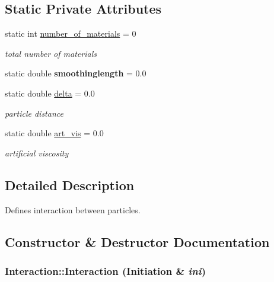 \subsection*{Static Private Attributes}
\begin{CompactItemize}
\item 
\hypertarget{classInteraction_aeeeca2f8dcc8cd22803b2ef6633319f}{
static int \hyperlink{classInteraction_aeeeca2f8dcc8cd22803b2ef6633319f}{number\_\-of\_\-materials} = 0}
\label{classInteraction_aeeeca2f8dcc8cd22803b2ef6633319f}

\begin{CompactList}\small\item\em total number of materials \item\end{CompactList}\item 
\hypertarget{classInteraction_7d9addfe3a9f9c69357d900cd9495c94}{
static double \textbf{smoothinglength} = 0.0}
\label{classInteraction_7d9addfe3a9f9c69357d900cd9495c94}

\item 
\hypertarget{classInteraction_4480c9589b1406bed453fcb0f72bc215}{
static double \hyperlink{classInteraction_4480c9589b1406bed453fcb0f72bc215}{delta} = 0.0}
\label{classInteraction_4480c9589b1406bed453fcb0f72bc215}

\begin{CompactList}\small\item\em particle distance \item\end{CompactList}\item 
\hypertarget{classInteraction_e39ad193f42e2a0d3579e6b59fca3d72}{
static double \hyperlink{classInteraction_e39ad193f42e2a0d3579e6b59fca3d72}{art\_\-vis} = 0.0}
\label{classInteraction_e39ad193f42e2a0d3579e6b59fca3d72}

\begin{CompactList}\small\item\em artificial viscosity \item\end{CompactList}\end{CompactItemize}


\subsection{Detailed Description}
Defines interaction between particles. 

\subsection{Constructor \& Destructor Documentation}
\hypertarget{classInteraction_76755da7b86df4bd62c2761d0bed095a}{
\subsubsection[{Interaction}]{\setlength{\rightskip}{0pt plus 5cm}Interaction::Interaction ({\bf Initiation} \& {\em ini})}}
\label{classInteraction_76755da7b86df4bd62c2761d0bed095a}


